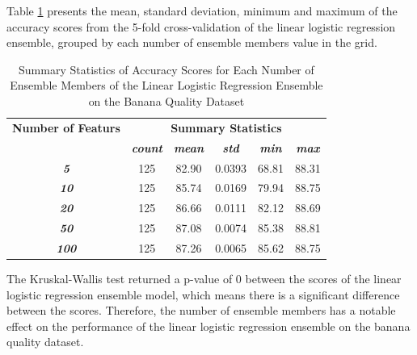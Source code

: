\documentclass[10pt, conference]{IEEEtran}
\begin{document}
Table \ref{table: BQ_member_linear_performance_metrics} presents the mean, standard deviation, minimum and maximum of the
accuracy scores from the 5-fold cross-validation of the linear logistic regression ensemble, grouped by each number of ensemble members
value in the grid.
\begin{table}[H]
    \caption{Summary Statistics of Accuracy Scores for Each Number of Ensemble Members of the Linear Logistic Regression Ensemble on the Banana Quality Dataset}
    \begin{center}
        \begin{tabular}{|c||c|c|c|c|c|}
            \hline
            \textbf{Number of Featurs}&\multicolumn{5}{|c|}{\textbf{Summary Statistics}} \\
            \cline{2-6}
                       &\textbf{\textit{count}} & \textbf{\textit{mean}} & \textbf{\textit{std}} & \textbf{\textit{min}} & \textbf{\textit{max}}\\
            \hline
            \textbf{\textit{5}}   & 125 & 82.90 & 0.0393 & 68.81 & 88.31 \\
            \textbf{\textit{10}}  & 125 & 85.74 & 0.0169 & 79.94 & 88.75 \\
            \textbf{\textit{20}}  & 125 & 86.66 & 0.0111 & 82.12 & 88.69 \\
            \textbf{\textit{50}}  & 125 & 87.08 & 0.0074 & 85.38 & 88.81 \\
            \textbf{\textit{100}} & 125 & 87.26 & 0.0065 & 85.62 & 88.75 \\
            \hline
        \end{tabular}
    \end{center}
    \label{table: BQ_member_linear_performance_metrics}
\end{table}
The Kruskal-Wallis test returned a p-value of 0 between the scores of the linear logistic regression ensemble model,
which means there is a significant difference between the scores. Therefore, the number of ensemble members
has a notable effect on the performance of the linear logistic regression ensemble on the banana quality dataset.
\end{document}
